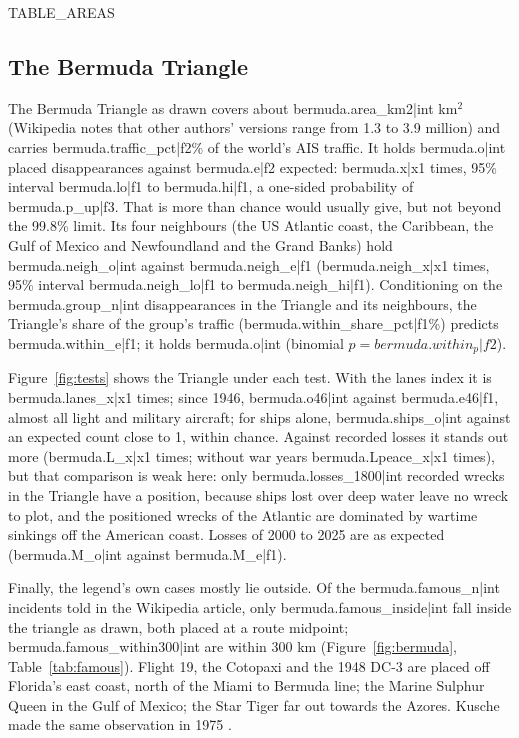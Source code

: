 \documentclass[11pt,a4paper]{article}
\begin{document}
{{TABLE_AREAS}}

\subsection{The Bermuda Triangle}
The Bermuda Triangle as drawn covers about {{bermuda.area_km2|int}} km$^2$ (Wikipedia notes that other authors' versions range from 1.3 to 3.9 million) and carries {{bermuda.traffic_pct|f2}}\% of the world's AIS traffic. It holds {{bermuda.o|int}} placed disappearances against {{bermuda.e|f2}} expected: {{bermuda.x|x1}} times, 95\% interval {{bermuda.lo|f1}} to {{bermuda.hi|f1}}, a one-sided probability of {{bermuda.p_up|f3}}. That is more than chance would usually give, but not beyond the 99.8\% limit. Its four neighbours (the US Atlantic coast, the Caribbean, the Gulf of Mexico and Newfoundland and the Grand Banks) hold {{bermuda.neigh_o|int}} against {{bermuda.neigh_e|f1}} ({{bermuda.neigh_x|x1}} times, 95\% interval {{bermuda.neigh_lo|f1}} to {{bermuda.neigh_hi|f1}}). Conditioning on the {{bermuda.group_n|int}} disappearances in the Triangle and its neighbours, the Triangle's share of the group's traffic ({{bermuda.within_share_pct|f1}}\%) predicts {{bermuda.within_e|f1}}; it holds {{bermuda.o|int}} (binomial $p = {{bermuda.within_p|f2}}$).

Figure~\ref{fig:tests} shows the Triangle under each test. With the lanes index it is {{bermuda.lanes_x|x1}} times; since 1946, {{bermuda.o46|int}} against {{bermuda.e46|f1}}, almost all light and military aircraft; for ships alone, {{bermuda.ships_o|int}} against an expected count close to 1, within chance. Against recorded losses it stands out more ({{bermuda.L_x|x1}} times; without war years {{bermuda.Lpeace_x|x1}} times), but that comparison is weak here: only {{bermuda.losses_1800|int}} recorded wrecks in the Triangle have a position, because ships lost over deep water leave no wreck to plot, and the positioned wrecks of the Atlantic are dominated by wartime sinkings off the American coast. Losses of 2000 to 2025 are as expected ({{bermuda.M_o|int}} against {{bermuda.M_e|f1}}).

Finally, the legend's own cases mostly lie outside. Of the {{bermuda.famous_n|int}} incidents told in the Wikipedia article, only {{bermuda.famous_inside|int}} fall inside the triangle as drawn, both placed at a route midpoint; {{bermuda.famous_within300|int}} are within 300 km (Figure~\ref{fig:bermuda}, Table~\ref{tab:famous}). Flight 19, the Cotopaxi and the 1948 DC-3 are placed off Florida's east coast, north of the Miami to Bermuda line; the Marine Sulphur Queen in the Gulf of Mexico; the Star Tiger far out towards the Azores. Kusche made the same observation in 1975 \citep{kusche}.
\end{document}
